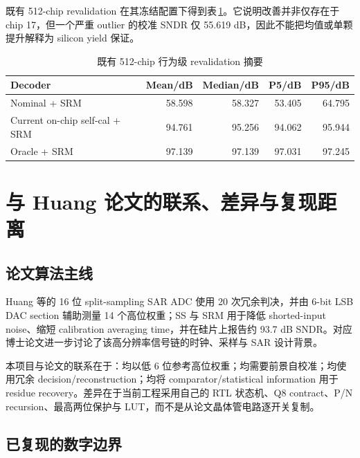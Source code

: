 \documentclass[UTF8,fontset=none,a4paper,11pt,openany]{ctexrep}
\begin{document}
既有 512-chip revalidation 在其冻结配置下得到表\,\ref{tab:mc512}。它说明改善并非仅存在于 chip 17，但一个严重 outlier 的校准 SNDR 仅 55.619 dB，因此不能把均值或单颗提升解释为 silicon yield 保证。

\begin{table}[H]
\centering
\caption{既有 512-chip 行为级 revalidation 摘要}
\label{tab:mc512}
\begin{tabular}{lrrrr}
\toprule
Decoder & Mean/dB & Median/dB & P5/dB & P95/dB\\
\midrule
Nominal + SRM & 58.598 & 58.327 & 53.405 & 64.795\\
Current on-chip self-cal + SRM & 94.761 & 95.256 & 94.062 & 95.944\\
Oracle + SRM & 97.139 & 97.139 & 97.031 & 97.245\\
\bottomrule
\end{tabular}
\end{table}

\chapter{与 Huang 论文的联系、差异与复现距离}

\section{论文算法主线}

Huang 等的 16 位 split-sampling SAR ADC 使用 20 次冗余判决，并由 6-bit LSB DAC section 辅助测量 14 个高位权重；SS 与 SRM 用于降低 shorted-input noise、缩短 calibration averaging time，并在硅片上报告约 93.7 dB SNDR\cite{huang2025}。对应博士论文进一步讨论了该高分辨率信号链的时钟、采样与 SAR 设计背景\cite{huang2024}。

本项目与论文的联系在于：均以低 6 位参考高位权重；均需要前景自校准；均使用冗余 decision/reconstruction；均将 comparator/statistical information 用于 residue recovery。差异在于当前工程采用自己的 RTL 状态机、Q8 contract、P/N recursion、最高两位保护与 LUT，而不是从论文晶体管电路逐开关复制。

\section{已复现的数字边界}
\end{document}
